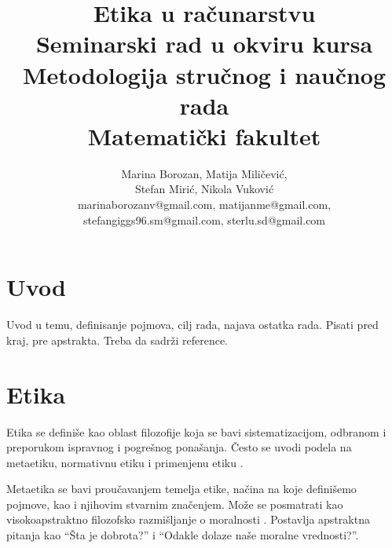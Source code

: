 \documentclass[a4paper]{article}
\begin{document}
\title{Etika u računarstvu\\ \small{Seminarski rad u okviru kursa\\Metodologija stručnog i naučnog rada\\ Matematički fakultet}}

\author{
	Marina Borozan, Matija Miličević,\\
	Stefan Mirić, Nikola Vuković\\
	marinaborozanv@gmail.com, matijanme@gmail.com,\\
	stefangiggs96.sm@gmail.com, sterlu.sd@gmail.com
}


\maketitle


\tableofcontents

\newpage

\section{Uvod}

Uvod u temu, definisanje pojmova, cilj rada, najava ostatka rada.
Pisati pred kraj, pre apstrakta. Treba da sadrži reference.

\section{Etika}
Etika se definiše kao oblast filozofije koja se bavi sistematizacijom, odbranom i preporukom ispravnog i pogrešnog ponašanja. Često se uvodi podela na metaetiku, normativnu etiku i primenjenu etiku \cite{ethics-iep}. 

Metaetika se bavi proučavanjem temelja etike, načina na koje definišemo pojmove, kao i njihovim stvarnim značenjem. Može se posmatrati kao visokoapstraktno filozofsko razmišljanje o moralnosti \cite{metaethics-iep}. Postavlja apstraktna pitanja kao ``Šta je dobrota?'' i ``Odakle dolaze naše moralne vrednosti?''.
\end{document}
